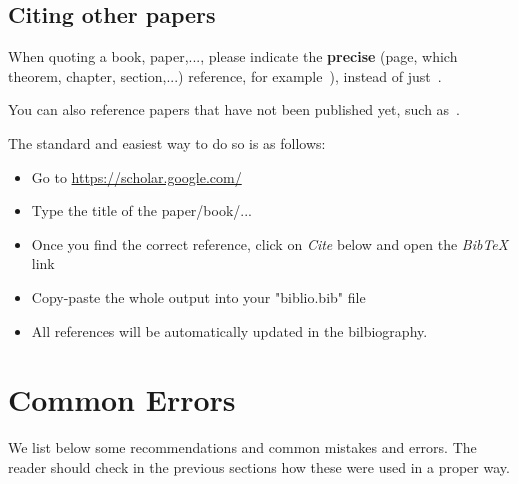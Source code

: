 \documentclass[a4paper, twoside]{report}
\theoremstyle{definition}
\numberwithin{equation}{section}
\begin{document}
\subsection{Citing other papers}
When quoting a book, paper,..., please indicate the \textbf{precise} (page, which theorem, chapter, section,...) reference,
for example~\cite[Proposition 2.13, page 291]{karatzas1991brownian}), instead of just~\cite{karatzas1991brownian}.

You can also reference papers that have not been published yet, such as~\cite{mytnik2015uniqueness}.

The standard and easiest way to do so is as follows:
\begin{itemize}
  \item Go to \href{https://scholar.google.com/}{https://scholar.google.com/}
  \item Type the title of the paper/book/...
  \item Once you find the correct reference, click on \emph{Cite} below and open the \emph{BibTeX} link
  \item Copy-paste the whole output into your "biblio.bib" file
  \item All references will be automatically updated in the bilbiography.
\end{itemize}
\section{Common Errors}\label{sec:WhatNotToDo}
We list below some recommendations and common mistakes and errors.
The reader should check in the previous sections how these were used in a proper way.
\end{document}
